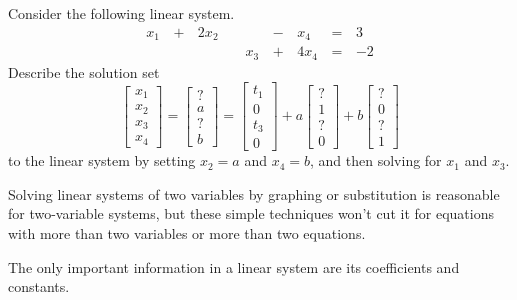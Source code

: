 \begin{applicationActivities}{1}{3}
\begin{activity}{10}
  Consider the following linear system.
  \begin{alignat*}{5}
    x_1 &\,+\,& 2x_2 &\, \,&     &\,-\,&  x_4 &\,=\,& 3 \\
        &\, \,&      &\, \,& x_3 &\,+\,& 4x_4 &\,=\,& -2
  \end{alignat*}
  Describe the solution set
  \[
    \begin{bmatrix}
      x_1 \\
      x_2 \\
      x_3 \\
      x_4
    \end{bmatrix}=
    \begin{bmatrix}
      ? \\
      a \\
      ? \\
      b
    \end{bmatrix}=
    \begin{bmatrix}
      t_1 \\
      0 \\
      t_3 \\
      0
    \end{bmatrix}+
    a\begin{bmatrix}
      ? \\
      1 \\
      ? \\
      0
    \end{bmatrix}+
    b\begin{bmatrix}
      ? \\
      0 \\
      ? \\
      1
    \end{bmatrix}
  \] to the linear system
  by setting \(x_2=a\) and \(x_4=b\), and then solving for \(x_1\) and
  \(x_3\).
\end{activity}

\begin{observation}
  Solving linear systems of two variables by graphing or substitution is
  reasonable for two-variable systems, but these simple techniques
  won't cut it for equations with
  more than two variables or more than two equations.
\end{observation}

\begin{remark}
  The only important information in a linear system are its coefficients and
  constants.


\end{remark}
\end{applicationActivities}
